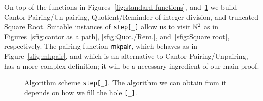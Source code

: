 \documentclass[preprint]{elsarticle}
\theoremstyle{remark}
\begin{document}
On top of the functions in Figures~\ref{fig:standard functions}, and~\ref{fig:function scheme step} we build Cantor Pairing/Un-pairing, Quotient/Reminder of integer division, and truncated Square Root. Suitable instances of \lstinline|step[_]| allow us to visit $ \mathbb{N}^2 $ as in Figures~\ref{sfig:cantor as a path}, \ref{sfig:Quot./Rem.}, and~\ref{sfig:Square root}, respectively. The pairing function $\mathsf{mkpair}$, which behaves as in Figure~\ref{sfig:mkpair}, and which is an alternative to Cantor Pairing/Unpairing, has a more complex definition; it will be a necessary ingredient of our main proof.

\begin{figure}
    \centering
    \caption{Algorithm scheme \lstinline|step[_]|. The algorithm we can obtain from it depends on how we fill the hole \lstinline|[_]|.}
    \label{fig:function scheme step}
\end{figure}
\end{document}
